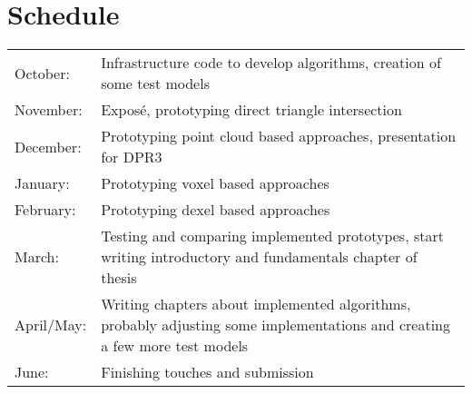 
\section{Schedule}

\begin{tabularx}{\textwidth}{l X}
	October: & Infrastructure code to develop algorithms, creation of some test models \\
	
	November: & Exposé, prototyping direct triangle intersection \\
	
	December: & Prototyping point cloud based approaches, presentation for DPR3 \\
	
	January: & Prototyping voxel based approaches \\
	
	February: & Prototyping dexel based approaches \\
	
	March: & Testing and comparing implemented prototypes, start writing introductory and fundamentals chapter of thesis \\
	
	April/May: & Writing chapters about implemented algorithms, probably adjusting some implementations and creating a few more test models \\
	
	June: & Finishing touches and submission \\
\end{tabularx}
